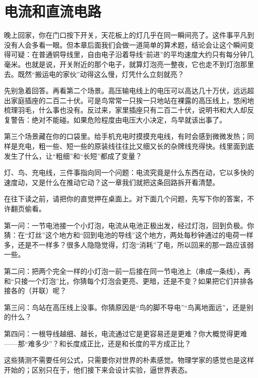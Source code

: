 \chapter{电流和直流电路}


晚上回家，你在门口按下开关，天花板上的灯几乎在同一瞬间亮了。这件事平凡到没有人会多看一眼。但本章后面我们会做一道简单的算术题，结论会让这个瞬间变得可疑：在普通铜导线里，自由电子沿着导线“前进”的平均速度大约只有每分钟几毫米。也就是说，开关附近的那个电子，就算灯泡亮一整夜，它也走不到灯泡那里去。既然“搬运电的家伙”动得这么慢，灯凭什么立刻就亮？

先别急着回答。再看第二个场景。高压输电线上的电压可以高达几十万伏，远远超出家庭插座的二百二十伏。可是鸟常常一只挨一只地站在裸露的高压线上，悠闲地梳理羽毛，什么事也没有。反过来，家里插座只有二百二十伏，说明书和大人却反复警告：绝对不能碰。如果危险程度由电压大小决定，鸟早就该出事了。

第三个场景藏在你的口袋里。给手机充电时摸摸充电线，有时会感到微微发热；同样是充电，粗一些、短一些的原装线往往比又细又长的杂牌线充得快。线里面到底发生了什么，让“粗细”和“长短”都成了变量？

灯、鸟、充电线，三件事指向同一个问题：电流究竟是什么东西在动，它以多快的速度动，又是什么在推动它动？这一章我们就把这条回路拆开看清楚。


在往下读之前，请把你的直觉押在桌面上。对下面几个问题，先写下你的答案，不许翻页偷看。

第一问：一节电池接一个小灯泡，电流从电池正极出发，经过灯泡，回到负极。你猜：在“灯丝”这个地方和“回到电池的导线”这个地方，两处每秒钟通过的电荷一样多，还是不一样多？很多人隐隐觉得，灯泡“消耗”了电，所以回来的那一路应该弱一些。

第二问：把两个完全一样的小灯泡一前一后接在同一节电池上（串成一条线），再和“只接一个灯泡”比，你猜每个灯泡会更亮、更暗，还是不变？如果把它们并排各接各的（并联）呢？

第三问：鸟站在高压线上没事。你猜原因是“鸟的脚不导电”“鸟离地面远”，还是别的什么？

第四问：一根导线越细、越长，电流通过它是更容易还是更难？你大概觉得更难——那“难多少”？和长度成正比，还是和长度的平方成正比？

这些猜测不需要任何公式，只需要你对世界的朴素感觉。物理学家的感觉也是这样开始的；区别只在于，他们接下来会设计实验，逼世界表态。


